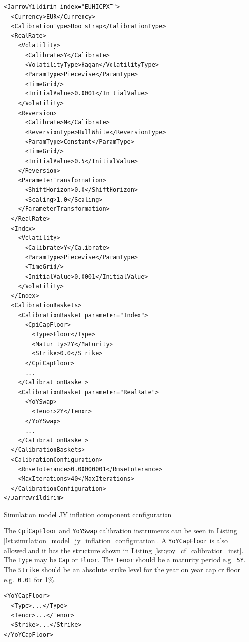 \documentclass[12pt, a4paper]{article}
\begin{document}
{\begin{listing}[H]
\begin{verbatim}
<JarrowYildirim index="EUHICPXT">
  <Currency>EUR</Currency>
  <CalibrationType>Bootstrap</CalibrationType>
  <RealRate>
    <Volatility>
      <Calibrate>Y</Calibrate>
      <VolatilityType>Hagan</VolatilityType>
      <ParamType>Piecewise</ParamType>
      <TimeGrid/>
      <InitialValue>0.0001</InitialValue>
    </Volatility>
    <Reversion>
      <Calibrate>N</Calibrate>
      <ReversionType>HullWhite</ReversionType>
      <ParamType>Constant</ParamType>
      <TimeGrid/>
      <InitialValue>0.5</InitialValue>
    </Reversion>
    <ParameterTransformation>
      <ShiftHorizon>0.0</ShiftHorizon>
      <Scaling>1.0</Scaling>
    </ParameterTransformation>
  </RealRate>
  <Index>
    <Volatility>
      <Calibrate>Y</Calibrate>
      <ParamType>Piecewise</ParamType>
      <TimeGrid/>
      <InitialValue>0.0001</InitialValue>
    </Volatility>
  </Index>
  <CalibrationBaskets>
    <CalibrationBasket parameter="Index">
      <CpiCapFloor>
        <Type>Floor</Type>
        <Maturity>2Y</Maturity>
        <Strike>0.0</Strike>
      </CpiCapFloor>
      ...
    </CalibrationBasket>
    <CalibrationBasket parameter="RealRate">
      <YoYSwap>
        <Tenor>2Y</Tenor>
      </YoYSwap>
      ...
    </CalibrationBasket>
  </CalibrationBaskets>
  <CalibrationConfiguration>
    <RmseTolerance>0.00000001</RmseTolerance>
    <MaxIterations>40</MaxIterations>
  </CalibrationConfiguration>
</JarrowYildirim>
\end{verbatim}
\caption{Simulation model JY inflation component configuration}
\label{lst:simulation_model_jy_inflation_configuration}
\end{listing}

The \lstinline!CpiCapFloor! and \lstinline!YoYSwap! calibration instruments can be seen in Listing \ref{lst:simulation_model_jy_inflation_configuration}. A \lstinline!YoYCapFloor! is 
also allowed and it has the structure shown in Listing \ref{lst:yoy_cf_calibration_inst}. The \lstinline!Type! may be \lstinline!Cap! or \lstinline!Floor!. The \lstinline!Tenor! should 
be a maturity period e.g.\ \lstinline!5Y!. The \lstinline!Strike! should be an absolute strike level for the year on year cap or floor e.g.\ \lstinline!0.01! for 1\%.

\begin{listing}[H]
\begin{verbatim}
<YoYCapFloor>
  <Type>...</Type>
  <Tenor>...</Tenor>
  <Strike>...</Strike>
</YoYCapFloor>
\end{verbatim}
\caption{Layout for \lstinline!YoYCapFloor! calibration instrument.}
\label{lst:yoy_cf_calibration_inst}
\end{listing}

}
\end{document}
